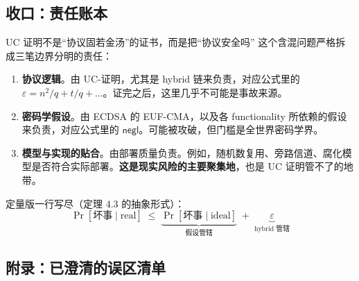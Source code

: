 \subsection{收口：责任账本}

UC 证明不是“协议固若金汤”的证书，而是把“协议安全吗”
这个含混问题严格拆成三笔边界分明的责任：

\begin{enumerate}
\def\labelenumi{\arabic{enumi}.}

\item
  \textbf{协议逻辑}。由 UC-证明，尤其是 hybrid
  链来负责，对应公式里的 $\varepsilon = n^2/q + t/q + \dots$。证完之后，这里几乎不可能是事故来源。
\item
  \textbf{密码学假设}。由 ECDSA 的 EUF-CMA，以及各 functionality
  所依赖的假设来负责，对应公式里的 $\mathsf{negl}$。可能被攻破，但门槛是全世界密码学界。
\item
  \textbf{模型与实现的贴合}。由部署质量负责。例如，随机数复用、旁路信道、腐化模型是否符合实际部署。\textbf{这是现实风险的主要聚集地}，也是
  UC 证明管不了的地带。
\end{enumerate}

定量版一行写尽（定理 4.3 的抽象形式）：
\begin{equation}\label{eq:uc-framework:7}
\Pr[\text{坏事} \mid \text{real}]
\;\le\;
\underbrace{\Pr[\text{坏事} \mid \text{ideal}]}_{\text{假设管辖}}
\;+\;
\underbrace{\varepsilon}_{\text{hybrid 管辖}}
\end{equation}

\subsection{附录：已澄清的误区清单}

